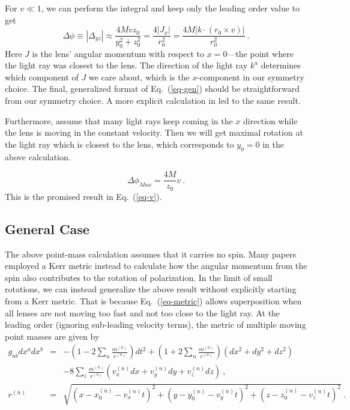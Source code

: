 \documentclass[aps,showpacs,onecolumn,floats,prd,superscriptaddress,nofootinbib]{revtex4}
\begin{document}
For $v\ll1$, we can perform the integral and keep only the leading order value to get 
\begin{equation}
\Delta\phi \equiv |\Delta_{yz}| \approx \frac{4Mvz_0}{y_0^2 + z_0^2}
= \frac{4|J_x|}{r_0^2}
= \frac{4 M |k\cdot(r_0\times v)|}{r_0^2}~.
\label{eq-gen}
\end{equation}
Here $J$ is the lens' angular momentum with respect to $x=0$---the point where the light ray was closest to the lens.
The direction of the light ray $k^a$ determines which component of $J$ we care about, which is the $x$-component in our symmetry choice.
The final, generalized format of Eq.~(\ref{eq-gen}) should be straightforward from our symmetry choice.
A more explicit calculation in \cite{KopMas01} led to the same result.

Furthermore, assume that many light rays keep coming in the $x$ direction while the lens is moving in the constant velocity.
Then we will get maximal rotation at the light ray which is closest to the lens, which corresponds to $y_0=0$ in the above calculation.

\begin{equation}
\Delta \phi_{Max} = \frac{4M}{z_0}v ~.
\end{equation}
This is the promised result in Eq.~(\ref{eq-v}).

\subsection{General Case}

The above point-mass calculation assumes that it carries no spin. 
Many papers employed a Kerr metric instead to calculate how the angular momentum from the spin also contributes to the rotation of polarization. 
In the limit of small rotations, we can instead generalize the above result without explicitly starting from a Kerr metric. 
That is because Eq.~(\ref{eq-metric}) allows superposition when all lenses are not moving too fast and not too close to the light ray. 
At the leading order (ignoring sub-leading velocity terms), the metric of multiple moving point masses are given by
\begin{eqnarray}
g_{ab}dx^adx^b &=& -\left( 1 - 2\sum_n \frac{m^{(n)}}{r^{(n)}} \right)dt^2
+\left( 1 + 2\sum_n \frac{m^{(n)}}{r^{(n)}} \right)(dx^2+dy^2+dz^2)
\\ \nonumber 
& & -8\sum_i \frac{m^{(n)} }{r^{(n)}}
\left(v^{(n)}_x dx + v^{(n)}_y dy+ v^{(n)}_z dz\right)~, \\
r^{(n)} &=& \sqrt{\left(x - x_0^{(n)} - v^{(n)}_x t\right)^2 + \left(y - y_0^{(n)} - v^{(n)}_y t\right)^2 
+ \left(z - z_0^{(n)} - v^{(n)}_z t\right)^2}~.
\end{eqnarray}
\end{document}
